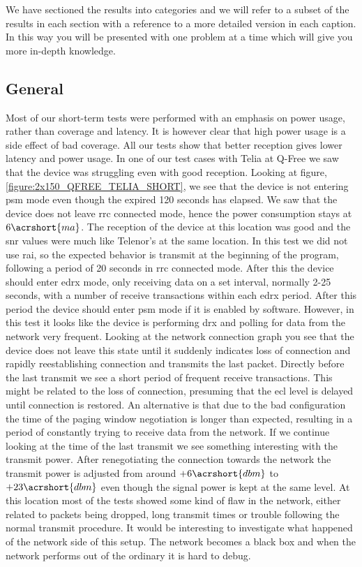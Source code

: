 \documentclass[USenglish]{ifimaster}  %
\begin{document}
We have sectioned the results into categories and we will refer to a subset of the results in each section with a reference to a more detailed version in each caption. In this way you will be presented with one problem at a time which will give you more in-depth knowledge.

\subsection{General} \label{ssection:generaltest}
Most of our short-term tests were performed with an emphasis on power usage, rather than coverage and latency. It is however clear that high power usage is a side effect of bad coverage. All our tests show that better reception gives lower latency and power usage. In one of our test cases with Telia at Q-Free we saw that the device was struggling even with good reception. Looking at figure, \vref{figure:2x150_QFREE_TELIA_SHORT}, we see that the device is not entering \acrshort{psm} mode even though the expired 120 seconds has elapsed. We saw that the device does not leave \acrshort{rrc} connected mode, hence the power consumption stays at ${6 \acrshort{ma}}$. The reception of the device at this location was good and the \acrshort{snr} values were much like Telenor's at the same location. In this test we did not use \acrshort{rai}, so the expected behavior is transmit at the beginning of the program, following a period of 20 seconds in \acrshort{rrc} connected mode. After this the device should enter \acrshort{edrx} mode, only receiving data on a set interval, normally 2-25 seconds, with a number of receive transactions within each \acrshort{edrx} period. After this period the device should enter \acrshort{psm} mode if it is enabled by software. However, in this test it looks like the device is performing \acrshort{drx} and polling for data from the network very frequent. Looking at the network connection graph you see that the device does not leave this state until it suddenly indicates loss of connection and rapidly reestablishing connection and transmits the last packet. Directly before the last transmit we see a short period of frequent receive transactions. This might be related to the loss of connection, presuming that the \acrshort{ecl} level is delayed until connection is restored. An alternative is that due to the bad configuration the time of the paging window negotiation is longer than expected, resulting in a period of constantly trying to receive data from the network. If we continue looking at the time of the last transmit we see something interesting with the transmit power. After renegotiating the connection towards the network the transmit power is adjusted from around ${+6 \acrshort{dbm}}$ to ${+23 \acrshort{dbm}}$ even though the signal power is kept at the same level. At this location most of the tests showed some kind of flaw in the network, either related to packets being dropped, long transmit times or trouble following the normal transmit procedure. It would be interesting to investigate what happened of the network side of this setup. The network becomes a black box and when the network performs out of the ordinary it is hard to debug.
\end{document}
